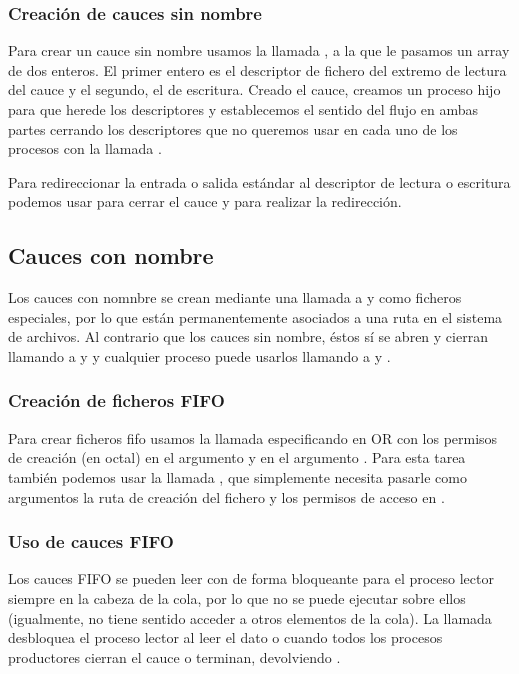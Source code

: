 \subsubsection{Creación de cauces sin nombre}

Para crear un cauce sin nombre usamos la llamada , a la que le pasamos un array de dos enteros.
El primer entero es el descriptor de fichero del extremo de lectura del cauce y el segundo, el de escritura.
Creado el cauce, creamos un proceso hijo para que herede los descriptores y establecemos el sentido del flujo en ambas partes cerrando los descriptores que no queremos usar en cada uno de los procesos con la llamada .

Para redireccionar la entrada o salida estándar al descriptor de lectura o escritura podemos usar  para cerrar el cauce y  para realizar la redirección.

\subsection{Cauces con nombre}

Los cauces con nomnbre se crean mediante una llamada a  y  como ficheros especiales, por lo que están permanentemente asociados a una ruta en el sistema de archivos.
Al contrario que los cauces sin nombre, éstos sí se abren y cierran llamando a  y  y cualquier proceso puede usarlos llamando a  y .

\subsubsection{Creación de ficheros FIFO}

Para crear ficheros fifo usamos la llamada  especificando  en OR con los permisos de creación (en octal) en el argumento  y  en el argumento .
Para esta tarea también podemos usar la llamada , que simplemente necesita pasarle como argumentos la ruta de creación del fichero y los permisos de acceso en .

\subsubsection{Uso de cauces FIFO}

Los cauces FIFO se pueden leer con  de forma bloqueante para el proceso lector siempre en la cabeza de la cola, por lo que no se puede ejecutar  sobre ellos (igualmente, no tiene sentido acceder a otros elementos de la cola).
La llamada  desbloquea el proceso lector al leer el dato o cuando todos los procesos productores cierran el cauce o terminan, devolviendo .

